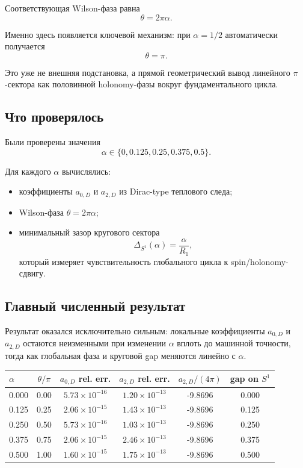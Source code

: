 \documentclass[12pt,a4paper]{article}
\begin{document}
Соответствующая Wilson-фаза равна
\[
\theta=2\pi\alpha.
\]

Именно здесь появляется ключевой механизм: при \(\alpha=1/2\) автоматически получается
\[
\theta=\pi.
\]

Это уже не внешняя подстановка, а прямой геометрический вывод линейного \(\pi\)-сектора как половинной holonomy-фазы вокруг фундаментального цикла.

\subsection{Что проверялось}

Были проверены значения
\[
\alpha\in\{0,0.125,0.25,0.375,0.5\}.
\]

Для каждого \(\alpha\) вычислялись:
\begin{itemize}
    \item коэффициенты \(a_{0,D}\) и \(a_{2,D}\) из Dirac-type теплового следа;
    \item Wilson-фаза \(\theta=2\pi\alpha\);
    \item минимальный зазор кругового сектора
    \[
    \Delta_{S^1}(\alpha)=\frac{\alpha}{R_1},
    \]
    который измеряет чувствительность глобального цикла к spin/holonomy-сдвигу.
\end{itemize}

\subsection{Главный численный результат}

Результат оказался исключительно сильным: локальные коэффициенты \(a_{0,D}\) и \(a_{2,D}\) остаются неизменными при изменении \(\alpha\) вплоть до машинной точности, тогда как глобальная фаза и круговой gap меняются линейно с \(\alpha\).

\begin{center}
\begin{tabular}{lccccc}
\toprule
$\alpha$ & $\theta/\pi$ & $a_{0,D}$ rel. err. & $a_{2,D}$ rel. err. & $a_{2,D}/(4\pi)$ & gap on $S^1$ \\
\midrule
0.000 & 0.00 & $5.73\times 10^{-16}$ & $1.20\times 10^{-13}$ & -9.8696 & 0.000 \\
0.125 & 0.25 & $2.06\times 10^{-15}$ & $1.43\times 10^{-13}$ & -9.8696 & 0.125 \\
0.250 & 0.50 & $5.73\times 10^{-16}$ & $1.03\times 10^{-13}$ & -9.8696 & 0.250 \\
0.375 & 0.75 & $2.06\times 10^{-15}$ & $2.46\times 10^{-13}$ & -9.8696 & 0.375 \\
0.500 & 1.00 & $1.60\times 10^{-15}$ & $1.75\times 10^{-13}$ & -9.8696 & 0.500 \\
\bottomrule
\end{tabular}
\end{center}
\end{document}
